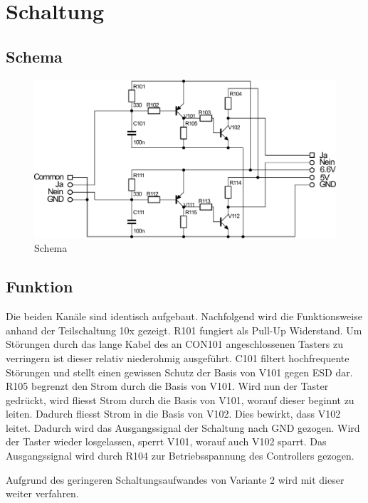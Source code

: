 
\section{Schaltung}

\subsection{Schema}
\begin{figure}[h!]
	\centering
	\includegraphics[scale=\schscale]{fig/xlr_pegelwandler_v_1_2_sch.pdf}
	\caption{Schema}
	\label{sch:pegw}
\end{figure}

\subsection{Funktion}
Die beiden Kanäle sind identisch aufgebaut. Nachfolgend wird die Funktionsweise anhand der Teilschaltung 10x gezeigt. R101 fungiert als Pull-Up Widerstand. Um Störungen durch das lange Kabel des an CON101 angeschlossenen Tasters zu verringern ist dieser relativ niederohmig ausgeführt. C101 filtert hochfrequente Störungen und stellt einen gewissen Schutz der Basis von V101 gegen ESD dar. R105 begrenzt den Strom durch die Basis von V101. Wird nun der Taster gedrückt, wird fliesst Strom durch die Basis von V101, worauf dieser beginnt zu leiten. Dadurch fliesst Strom in die Basis von V102. Dies bewirkt, dass V102 leitet. Dadurch wird das Ausgangssignal der Schaltung nach GND gezogen. Wird der Taster wieder losgelassen, sperrt V101, worauf auch V102 sparrt. Das Ausgangssignal wird durch R104 zur Betriebsspannung des Controllers gezogen. 

Aufgrund des geringeren Schaltungsaufwandes von Variante 2 wird mit dieser weiter verfahren. 


